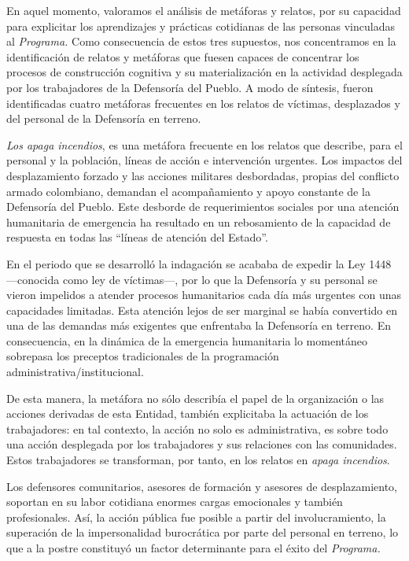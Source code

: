 \documentclass[
  spanish,
  11pt,
  a4paper,
]{scrbook}
\begin{document}
En aquel momento, valoramos el análisis de metáforas y relatos, por su
capacidad para explicitar los aprendizajes y prácticas cotidianas de las
personas vinculadas al \emph{Programa.} Como consecuencia de estos tres
supuestos, nos concentramos en la identificación de relatos y metáforas
que fuesen capaces de concentrar los procesos de construcción cognitiva
y su materialización en la actividad desplegada por los trabajadores de
la Defensoría del Pueblo. A modo de síntesis, fueron identificadas
cuatro metáforas frecuentes en los relatos de víctimas, desplazados y
del personal de la Defensoría en terreno.

\emph{Los apaga incendios}, es una metáfora frecuente en los relatos que
describe, para el personal y la población, líneas de acción e
intervención urgentes. Los impactos del desplazamiento forzado y las
acciones militares desbordadas, propias del conflicto armado colombiano,
demandan el acompañamiento y apoyo constante de la Defensoría del
Pueblo. Este desborde de requerimientos sociales por una atención
humanitaria de emergencia ha resultado en un rebosamiento de la
capacidad de respuesta en todas las ``líneas de atención del Estado''.

En el periodo que se desarrolló la indagación se acababa de expedir la
Ley 1448 ---conocida como ley de víctimas---, por lo que la Defensoría y
su personal se vieron impelidos a atender procesos humanitarios cada día
más urgentes con unas capacidades limitadas. Esta atención lejos de ser
marginal se había convertido en una de las demandas más exigentes que
enfrentaba la Defensoría en terreno. En consecuencia, en la dinámica de
la emergencia humanitaria lo momentáneo sobrepasa los preceptos
tradicionales de la programación administrativa/institucional.

De esta manera, la metáfora no sólo describía el papel de la
organización o las acciones derivadas de esta Entidad, también
explicitaba la actuación de los trabajadores: en tal contexto, la acción
no solo es administrativa, es sobre todo una acción desplegada por los
trabajadores y sus relaciones con las comunidades. Estos trabajadores se
transforman, por tanto, en los relatos en \emph{apaga incendios}.

Los defensores comunitarios, asesores de formación y asesores de
desplazamiento, soportan en su labor cotidiana enormes cargas
emocionales y también profesionales. Así, la acción pública fue posible
a partir del involucramiento, la superación de la impersonalidad
burocrática por parte del personal en terreno, lo que a la postre
constituyó un factor determinante para el éxito del \emph{Programa.}
\end{document}

